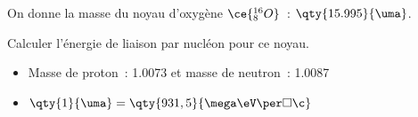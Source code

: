 On donne la masse du noyau d'oxygène $\ce{_{8}^{16}O}$~: $\qty{15.995}{\uma}$.

Calculer l'énergie de liaison par nucléon pour ce noyau.

\begin{donnees}
    \begin{itemize}
        \item Masse de proton~: \qty{1.0073}{\uma} et
              masse de neutron~: \qty{1.0087}{\uma}
        \item $\qty{1}{\uma}=\qty{931,5}{\mega\eV\per\square\c}$
    \end{itemize}
\end{donnees}

